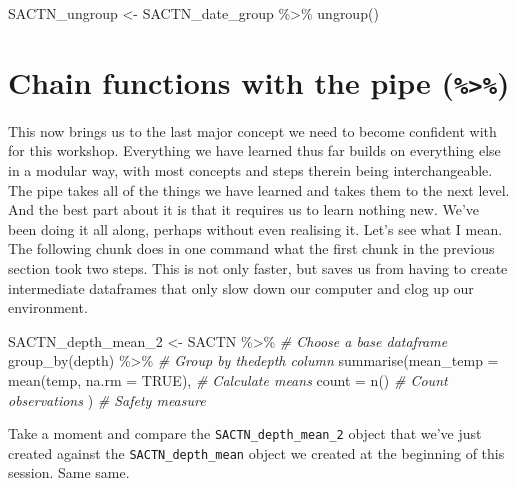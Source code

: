 \documentclass[
]{book}
\newenvironment{Shaded}{\begin{snugshade}}{\end{snugshade}}
\newcommand{\AttributeTok}[1]{\textcolor[rgb]{0.77,0.63,0.00}{#1}}
\newcommand{\CommentTok}[1]{\textcolor[rgb]{0.56,0.35,0.01}{\textit{#1}}}
\newcommand{\ConstantTok}[1]{\textcolor[rgb]{0.00,0.00,0.00}{#1}}
\newcommand{\FunctionTok}[1]{\textcolor[rgb]{0.00,0.00,0.00}{#1}}
\newcommand{\NormalTok}[1]{#1}
\newcommand{\OtherTok}[1]{\textcolor[rgb]{0.56,0.35,0.01}{#1}}
\newcommand{\SpecialCharTok}[1]{\textcolor[rgb]{0.00,0.00,0.00}{#1}}
\begin{document}
\begin{Shaded}
\begin{Highlighting}[]
\NormalTok{SACTN\_ungroup }\OtherTok{\textless{}{-}}\NormalTok{ SACTN\_date\_group }\SpecialCharTok{\%\textgreater{}\%} 
  \FunctionTok{ungroup}\NormalTok{()}
\end{Highlighting}
\end{Shaded}

\hypertarget{chain-functions-with-the-pipe}{%
\section{\texorpdfstring{Chain functions with the pipe (\texttt{\%\textgreater{}\%})}{Chain functions with the pipe (\%\textgreater\%)}}\label{chain-functions-with-the-pipe}}

This now brings us to the last major concept we need to become confident with for this workshop. Everything we have learned thus far builds on everything else in a modular way, with most concepts and steps therein being interchangeable. The pipe takes all of the things we have learned and takes them to the next level. And the best part about it is that it requires us to learn nothing new. We've been doing it all along, perhaps without even realising it. Let's see what I mean. The following chunk does in one command what the first chunk in the previous section took two steps. This is not only faster, but saves us from having to create intermediate dataframes that only slow down our computer and clog up our environment.

\begin{Shaded}
\begin{Highlighting}[]
\NormalTok{SACTN\_depth\_mean\_2 }\OtherTok{\textless{}{-}}\NormalTok{ SACTN }\SpecialCharTok{\%\textgreater{}\%} \CommentTok{\# Choose a base dataframe}
  \FunctionTok{group\_by}\NormalTok{(depth) }\SpecialCharTok{\%\textgreater{}\%} \CommentTok{\# Group by thedepth column}
  \FunctionTok{summarise}\NormalTok{(}\AttributeTok{mean\_temp =} \FunctionTok{mean}\NormalTok{(temp, }\AttributeTok{na.rm =} \ConstantTok{TRUE}\NormalTok{), }\CommentTok{\# Calculate means}
  \AttributeTok{count =} \FunctionTok{n}\NormalTok{() }\CommentTok{\# Count observations}
\NormalTok{) }\CommentTok{\# Safety measure}
\end{Highlighting}
\end{Shaded}

Take a moment and compare the \texttt{SACTN\_depth\_mean\_2} object that we've just created against the \texttt{SACTN\_depth\_mean} object we created at the beginning of this session. Same same.
\end{document}
